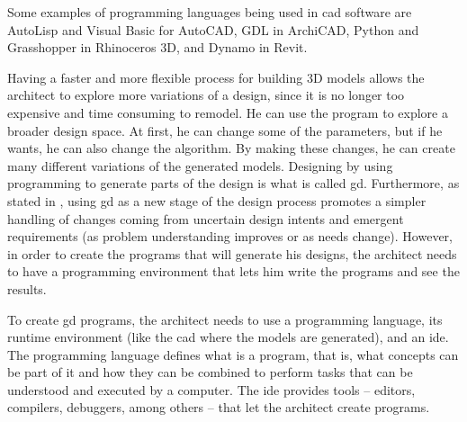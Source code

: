 Some examples of programming languages being used in \gls{cad} software are AutoLisp and Visual Basic for AutoCAD, GDL in ArchiCAD, Python and Grasshopper in Rhinoceros 3D, and Dynamo in Revit.


Having a faster and more flexible process for building 3D models allows the architect to explore more variations of a design, since it is no longer too expensive and time consuming to remodel.
He can use the program to explore a broader design space.
At first, he can change some of the parameters, but if he wants, he can also change the algorithm.
By making these changes, he can create many different variations of the generated models.
Designing by using programming to generate parts of the design is what is called \gls{gd}.
Furthermore, as stated in \cite{leitao2014pushing}, using \gls{gd} as a new stage of the design process promotes a simpler handling of changes coming from uncertain design intents and emergent requirements (as problem understanding improves or as needs change).
However, in order to create the programs that will generate his designs, the architect needs to have a programming environment that lets him write the programs and see the results.


To create \gls{gd} programs, the architect needs to use a programming language, its runtime environment (like the \gls{cad} where the models are generated), and an \gls{ide}.
The programming language defines what is a program, that is, what concepts can be part of it and how they can be combined to perform tasks that can be understood and executed by a computer.
The \gls{ide} provides tools -- editors, compilers, debuggers, among others -- that let the architect create programs.


